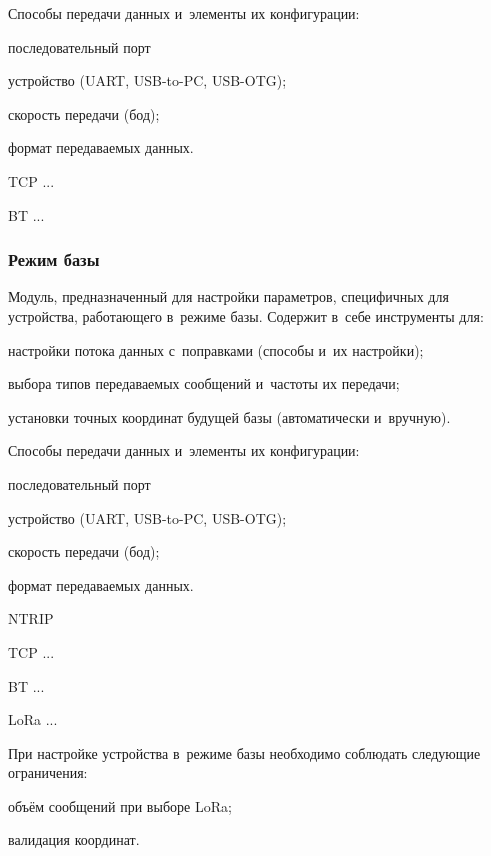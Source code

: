 Способы передачи данных и~элементы их конфигурации:
\begin{dashitemize}
  \item последовательный порт
  \begin{dashitemize}
    \item устройство (UART, USB-to-PC, USB-OTG);
    \item скорость передачи (бод);
    \item формат передаваемых данных.
  \end{dashitemize}

  \item TCP ...
  \item BT ...
\end{dashitemize}

\subsubsection{Режим базы}

Модуль, предназначенный для настройки параметров, специфичных для устройства, работающего в~режиме базы. Содержит в~себе инструменты для:
\begin{dashitemize}
  \item настройки потока данных с~поправками (способы и~их настройки);
  \item выбора типов передаваемых сообщений и~частоты их передачи;
  \item установки точных координат будущей базы (автоматически и~вручную).
\end{dashitemize}

Способы передачи данных и~элементы их конфигурации:
\begin{dashitemize}
  \item последовательный порт
  \begin{dashitemize}
    \item устройство (UART, USB-to-PC, USB-OTG);
    \item скорость передачи (бод);
    \item формат передаваемых данных.
  \end{dashitemize}

  \item NTRIP
  \item TCP ...
  \item BT ...
  \item LoRa ...
\end{dashitemize}

При настройке устройства в~режиме базы необходимо соблюдать следующие ограничения:
\begin{dashitemize}
  \item объём сообщений при выборе LoRa;
  \item валидация координат.
\end{dashitemize}


